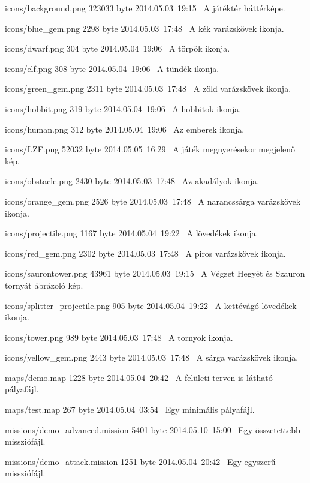 \begin{fajllista}


\fajl
{icons/background.png}
{323033 byte}
{2014.05.03~19:15~}
{A játéktér háttérképe.}

\fajl
{icons/blue\_gem.png}
{2298 byte}
{2014.05.03~17:48~}
{A kék varázskövek ikonja.}

\fajl
{icons/dwarf.png}
{304 byte}
{2014.05.04~19:06~}
{A törpök ikonja.}

\fajl
{icons/elf.png}
{308 byte}
{2014.05.04~19:06~}
{A tündék ikonja.}

\fajl
{icons/green\_gem.png}
{2311 byte}
{2014.05.03~17:48~}
{A zöld varázskövek ikonja.}

\fajl
{icons/hobbit.png}
{319 byte}
{2014.05.04~19:06~}
{A hobbitok ikonja.}

\fajl
{icons/human.png}
{312 byte}
{2014.05.04~19:06~}
{Az emberek ikonja.}

\fajl
{icons/LZF.png}
{52032 byte}
{2014.05.05~16:29~}
{A játék megnyerésekor megjelenő kép.}

\fajl
{icons/obstacle.png}
{2430 byte}
{2014.05.03~17:48~}
{Az akadályok ikonja.}

\fajl
{icons/orange\_gem.png}
{2526 byte}
{2014.05.03~17:48~}
{A narancssárga varázskövek ikonja.}

\fajl
{icons/projectile.png}
{1167 byte}
{2014.05.04~19:22~}
{A lövedékek ikonja.}

\fajl
{icons/red\_gem.png}
{2302 byte}
{2014.05.03~17:48~}
{A piros varázskövek ikonja.}

\fajl
{icons/saurontower.png}
{43961 byte}
{2014.05.03~19:15~}
{A Végzet Hegyét és Szauron tornyát ábrázoló kép.}

\fajl
{icons/splitter\_projectile.png}
{905 byte}
{2014.05.04~19:22~}
{A kettévágó lövedékek ikonja.}

\fajl
{icons/tower.png}
{989 byte}
{2014.05.03~17:48~}
{A tornyok ikonja.}

\fajl
{icons/yellow\_gem.png}
{2443 byte}
{2014.05.03~17:48~}
{A sárga varázskövek ikonja.}


\fajl
{maps/demo.map}
{1228 byte}
{2014.05.04~20:42~}
{A felületi terven is látható pályafájl.}

\fajl
{maps/test.map}
{267 byte}
{2014.05.04~03:54~}
{Egy minimális pályafájl.}


\fajl
{missions/demo\_advanced.mission}
{5401 byte}
{2014.05.10~15:00~}
{Egy összetettebb missziófájl.}

\fajl
{missions/demo\_attack.mission}
{1251 byte}
{2014.05.04~20:42~}
{Egy egyszerű missziófájl.}


\end{fajllista}
